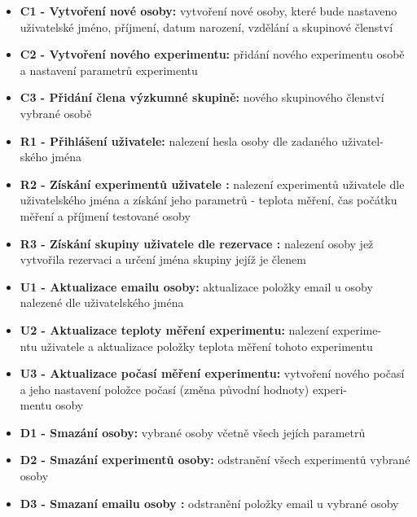 \documentclass{projekt}
\begin{document}
\begin{itemize}
\item {\bf C1 - Vytvoření nové osoby:} vytvoření nové osoby, které bude nastaveno uživatelské jméno, příjmení, datum narození, vzdělání a skupinové členství 
\item {\bf C2 - Vytvoření nového experimentu:} přidání nového experimentu osobě a nastavení  parametrů experimentu
\item {\bf C3 - Přidání člena výzkumné skupině:} nového skupinového členství vybrané osobě

\vspace{0.65cm}

\item {\bf R1 - Přihlášení uživatele:} nalezení hesla osoby dle zadaného uživatel-\\ského jména
\item {\bf R2 - Získání experimentů uživatele :} nalezení experimentů uživatele dle uživatelského jména a získání jeho parametrů - teplota měření, čas počátku měření a příjmení testované osoby
\item {\bf R3 - Získání skupiny uživatele dle rezervace :} nalezení osoby jež vytvořila rezervaci a určení jména skupiny jejíž je členem

\vspace{0.65cm}

\item {\bf U1 - Aktualizace emailu osoby:} aktualizace položky email u osoby nalezené dle uživatelského jména
\item {\bf U2 - Aktualizace teploty měření experimentu:} nalezení experime-\\ntu uživatele a aktualizace položky teplota měření tohoto experimentu
\item {\bf U3 - Aktualizace počasí měření experimentu:} vytvoření nového počasí a jeho nastavení položce počasí (změna původní hodnoty) experi-\\mentu osoby

\vspace{0.65cm}

\item {\bf D1 - Smazání osoby:} vybrané osoby včetně všech jejích parametrů
\item {\bf D2 - Smazání experimentů osoby:} odstranění všech experimentů vybrané osoby
\item {\bf D3 - Smazaní emailu osoby :} odstranění položky email u vybrané osoby



\end{itemize}
\end{document}
